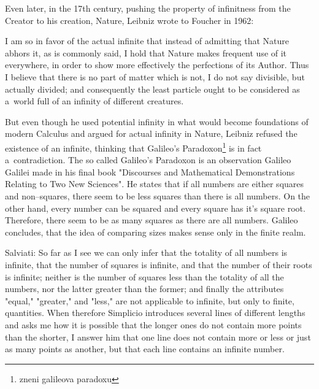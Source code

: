 \documentclass[12pt,a4paper]{article}
\begin{document}
Even later, in the 17th century, pushing the property of infinitness from the Creator to his creation, Nature, Leibniz wrote to Foucher in 1962:
\begin{displayquote}
I am so in favor of the actual infinite that instead of admitting that Nature abhors
it, as is commonly said, I hold that Nature makes frequent use of it everywhere,
in order to show more effectively the perfections of its Author. Thus I believe that
there is no part of matter which is not, I do not say divisible, but actually divided;
and consequently the least particle ought to be considered as a~world full of an
infinity of different creatures.
\end{displayquote}
But even though he used potential infinity in what would become foundations of modern Calculus and argued for actual infinity in Nature, Leibniz refused the existence of an infinite, thinking that Galileo's Paradoxon\footnote{zneni galileova paradoxu} is in fact a~contradiction. The so called Galileo's Paradoxon is an observation Galileo Galilei made in his final book "Discourses and Mathematical Demonstrations Relating to Two New Sciences".
He states that if all numbers are either squares and non–squares, there seem to be less squares than there is all numbers. On the other hand, every number can be squared and every square has it's square root. Therefore, there seem to be as many squares as there are all numbers. Galileo concludes, that the idea of comparing sizes makes sense only in the finite realm.
\begin{displayquote}
Salviati: So far as I see we can only infer that the totality of all numbers is infinite, that the number of squares is infinite, and that the number of their roots is infinite; neither is the number of squares less than the totality of all the numbers, nor the latter greater than the former; and finally the attributes "equal," "greater," and "less," are not applicable to infinite, but only to finite, quantities. When therefore Simplicio introduces several lines of different lengths and asks me how it is possible that the longer ones do not contain more points than the shorter, I answer him that one line does not contain more or less or just as many points as another, but that each line contains an infinite number.
\end{displayquote}
\end{document}
